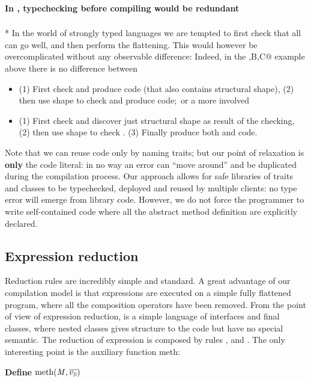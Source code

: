 \paragraph{In \name, typechecking before compiling would be redundant}${}_{}$\\*
In the world of strongly typed languages we are tempted to
first check that all can go well, and then perform the flattening.
This would however be overcomplicated without any observable difference:
Indeed, in the \Q@A,B,C@ example above there is no difference
between
\begin{itemize}
\item  (1) First check \Q@B@ and produce \Q@B@ code (that also contains \Q@B@ structural shape),
  (2) then use \Q@B@ shape to check \Q@C@ and produce \Q@C@ code;\ 
or a more involved
\item  (1) First check \Q@B@ and discover just \Q@B@ structural shape as result of the checking,
  (2) then use \Q@B@ shape to check \Q@C@.
  (3) Finally produce both \Q@B@ and \Q@C@ code.
\end{itemize}

\noindent Note that we can reuse code only by naming traits; but our point of relaxation is {\bf only} the code literal: in no way an error can ``move around'' and be duplicated during the compilation process.
Our approach allows for safe libraries of traits and classes to be typechecked, deployed and reused by multiple clients: no type error will emerge from library code.
However, we do not force the programmer to write self-contained code where all the abstract method definition are explicitly declared.



\subsection{Expression reduction}
Reduction rules are incredibly simple and standard.
A great advantage of our compilation model is that expressions are executed on
a simple fully flattened program, 
where all the composition operators have been removed.
From the point of view of expression reduction, \name is a simple language of 
interfaces and final classes, where nested classes gives structure to the code but have no special semantic.
The reduction of expression is composed by rules
, and .
The only interesting point is the auxiliary function meth:


\noindent\textbf{Define }$\text{meth}(\mM,\overline\vds)$

